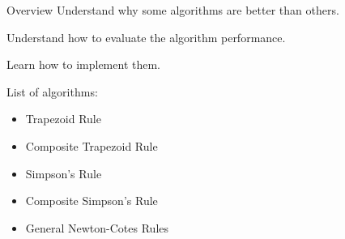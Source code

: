 \documentclass[10pt]{beamer}
\begin{document}
\begin{frame}{Overview}
   Understand why some algorithms are better than others. 
   \bigskip
   
   Understand how to evaluate the algorithm performance. 
   \bigskip

   Learn how to implement them. 
   \bigskip

   List of  algorithms:
   \begin{itemize}
     \item Trapezoid Rule
     \item Composite Trapezoid Rule
     \item Simpson's Rule
     \item Composite Simpson's Rule
     \item General Newton-Cotes Rules
   \end{itemize}
\end{frame}
\end{document}
